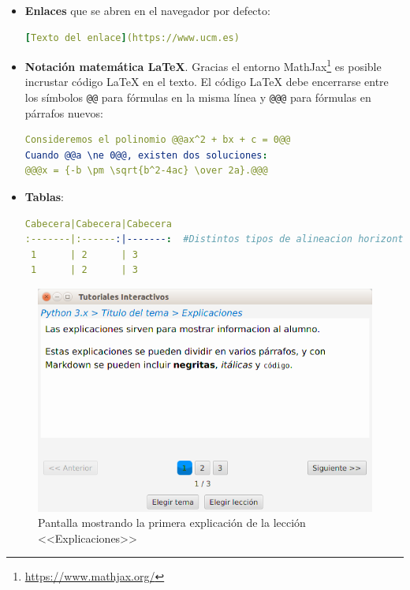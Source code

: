 \documentclass[]{article}
\newcommand{\code}[1]{{\lstinline[basicstyle=\ttfamily,mathescape]!#1!}}
\begin{document}
\begin{itemize}
\begin{lstlisting}[language=yaml,numbers=none]
**Imagen desde el directorio de temas, con ruta relativa**
![triangulo](file://img/triangulo.jpg)
\end{lstlisting}		
Todas las imágenes cuya ruta comience con \code{file://} serán consideradas imágenes locales cuya ruta es relativa al directorio donde reside el tema actual. Por ejemplo, si el tema actual reside en <<\code{/opt/temas/Python 3.x}>>, la imagen <<\code{file://img/triangulo.jpg}>> se referirá al fichero situado en <<\code{/opt/temas/Python 3.x/img/triangulo.jpg}>>.
	\item \textbf{Enlaces} que se abren en el navegador por defecto:
\begin{lstlisting}[language=yaml,numbers=none]
[Texto del enlace](https://www.ucm.es)
\end{lstlisting}
	\item \textbf{Notación matemática \LaTeX}. Gracias el entorno MathJax\footnote{\url{https://www.mathjax.org/}} es posible incrustar código \LaTeX{} en el texto. El código \LaTeX{} debe encerrarse entre los símbolos \code{@@} para fórmulas en la misma línea y \code{@@@} para fórmulas en párrafos nuevos:
\begin{lstlisting}[language=yaml,numbers=none]
Consideremos el polinomio @@ax^2 + bx + c = 0@@
Cuando @@a \ne 0@@, existen dos soluciones:
@@@x = {-b \pm \sqrt{b^2-4ac} \over 2a}.@@@	
\end{lstlisting}
	\item \textbf{Tablas}:
\begin{lstlisting}[language=yaml,numbers=none]
Cabecera|Cabecera|Cabecera
:-------|:------:|-------:  #Distintos tipos de alineacion horizontal
 1      | 2      | 3
 1      | 2      | 3
\end{lstlisting}	
\end{itemize}

\begin{figure}[tb]
	\centerline{\includegraphics[scale=0.5]{explicacion}}
	\caption{Pantalla mostrando la primera explicación de la lección <<Explicaciones>>\label{fig:explicacion}}
\end{figure}
\end{document}
